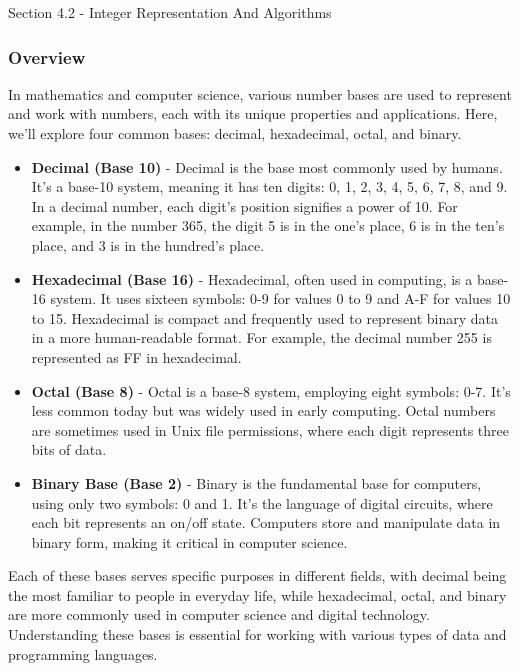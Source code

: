 \begin{notes}{Section 4.2 - Integer Representation And Algorithms}
    \subsubsection*{Overview}

    In mathematics and computer science, various number bases are used to represent and work with numbers, each with its unique properties and applications. Here, we'll explore four common bases: decimal, 
    hexadecimal, octal, and binary.

    \begin{itemize}
        \item \textbf{Decimal (Base 10)} - Decimal is the base most commonly used by humans. It's a base-10 system, meaning it has ten digits: 0, 1, 2, 3, 4, 5, 6, 7, 8, and 9. In a decimal number, each 
        digit's position signifies a power of 10. For example, in the number 365, the digit 5 is in the one's place, 6 is in the ten's place, and 3 is in the hundred's place.

        \item \textbf{Hexadecimal (Base 16)} - Hexadecimal, often used in computing, is a base-16 system. It uses sixteen symbols: 0-9 for values 0 to 9 and A-F for values 10 to 15. Hexadecimal is compact 
        and frequently used to represent binary data in a more human-readable format. For example, the decimal number 255 is represented as FF in hexadecimal.

        \item \textbf{Octal (Base 8)} - Octal is a base-8 system, employing eight symbols: 0-7. It's less common today but was widely used in early computing. Octal numbers are sometimes used in Unix file 
        permissions, where each digit represents three bits of data.

        \item \textbf{Binary Base (Base 2)} - Binary is the fundamental base for computers, using only two symbols: 0 and 1. It's the language of digital circuits, where each bit represents an on/off state. 
        Computers store and manipulate data in binary form, making it critical in computer science.
    \end{itemize}

    Each of these bases serves specific purposes in different fields, with decimal being the most familiar to people in everyday life, while hexadecimal, octal, and binary are more commonly used in computer 
    science and digital technology. Understanding these bases is essential for working with various types of data and programming languages.
\end{notes}